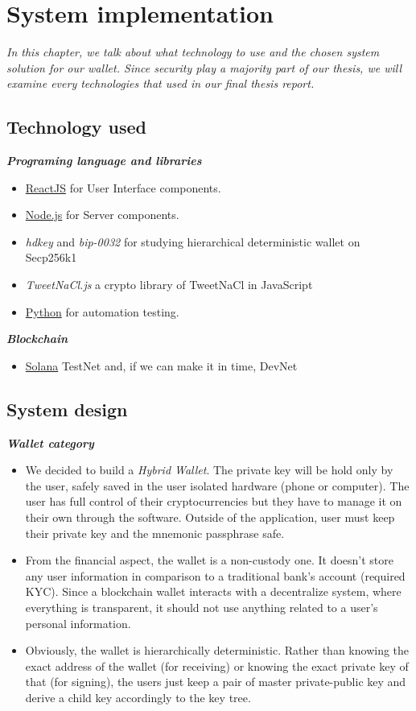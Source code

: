\chapter{System implementation} \label{chap:System_implementation}
\textit{In this chapter, we talk about what technology to use and the chosen system solution for our wallet. Since security play a majority part of our thesis, we will examine every technologies that used in our final thesis report.}
\minitoc

\section{Technology used}
{\textit {\textbf{Programing language and libraries}}}
\begin{itemize}
\item \href{https://reactjs.org/}{ReactJS} for User Interface components. 
\item \href{https://nodejs.org/en/}{Node.js} for Server components.
\item \emph{hdkey} and \emph{bip-0032} for studying hierarchical deterministic wallet on Secp256k1
\item \emph{TweetNaCl.js} a crypto library of TweetNaCl in JavaScript
\item \href{https://www.python.org/}{Python} for automation testing.
\end{itemize}

{\textit {\textbf{Blockchain}}}
\begin{itemize}
    \item \href{https://solana.com/}{Solana} TestNet and, if we can make it in time, DevNet
\end{itemize}

\section{System design}
{\textit {\textbf{Wallet category}}}
\begin{itemize}
    \item We decided to build a \emph{Hybrid Wallet}. The private key will be hold only by the user, safely saved in the user isolated hardware (phone or computer). The user has full control of their cryptocurrencies but they have to manage it on their own through the software. Outside of the application, user must keep their private key and the mnemonic passphrase safe.
    \item From the financial aspect, the wallet is a non-custody one. It doesn't store any user information in comparison to a traditional bank's account (required KYC). Since a blockchain wallet interacts with a decentralize system, where everything is transparent, it should not use anything related to a user's personal information.
    \item Obviously, the wallet is hierarchically deterministic. Rather than knowing the exact address of the wallet (for receiving) or knowing the exact private key of that (for signing), the users just keep a pair of master private-public key and derive a child key accordingly to the key tree.
\end{itemize}

